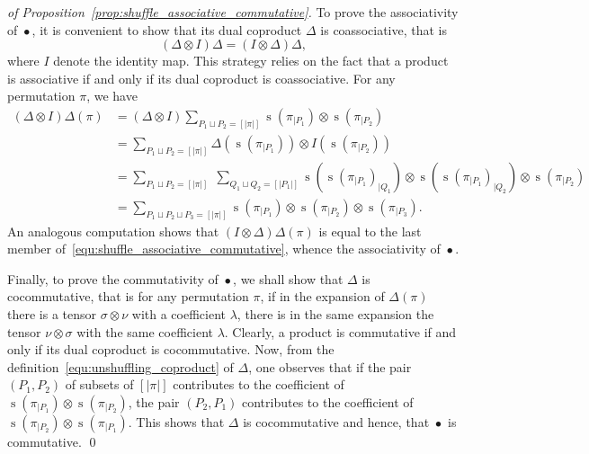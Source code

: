 \documentclass[a4paper]{llncs}
\DeclareMathOperator{\STD}{\mathrm{s}}
\DeclareMathOperator{\SHUFFLE}{\bullet}
\begin{document}
\begin{proof}[of Proposition~\ref{prop:shuffle_associative_commutative}]
    To prove the associativity of $\SHUFFLE$, it is convenient to show
    that its dual coproduct $\Delta$ is coassociative, that is
    \begin{equation}
        (\Delta \otimes I) \Delta = (I \otimes \Delta) \Delta,
    \end{equation}
    where $I$ denote the identity map. This strategy relies on the fact
    that a product is associative if and only if its dual coproduct is
    coassociative. For any permutation $\pi$, we have
    \begin{equation} \begin{split}
    \label{equ:shuffle_associative_commutative}
        (\Delta \otimes I) \Delta(\pi) & =
        (\Delta \otimes I)
        \sum_{P_1 \sqcup P_2 = [|\pi|]}
        \STD\left(\pi_{|P_1}\right) \otimes \STD\left(\pi_{|P_2}\right) \\
        & =
        \sum_{P_1 \sqcup P_2 = [|\pi|]}
        \Delta\left(\STD\left(\pi_{|P_1}\right)\right)
        \otimes I\left(\STD\left(\pi_{|P_2}\right)\right) \\
        & =
        \sum_{P_1 \sqcup P_2 = [|\pi|]} \;
        \sum_{Q_1 \sqcup Q_2 = [|P_1|]}
        \STD\left(\STD\left(\pi_{|P_1}\right)_{|Q_1}\right)
        \otimes
        \STD\left(\STD\left(\pi_{|P_1}\right)_{|Q_2}\right)
        \otimes \STD\left(\pi_{|P_2}\right) \\
        & =
        \sum_{P_1 \sqcup P_2 \sqcup P_3 = [|\pi|]}
        \STD\left(\pi_{|P_1}\right) \otimes
        \STD\left(\pi_{|P_2}\right) \otimes
        \STD\left(\pi_{|P_3}\right).
    \end{split} \end{equation}
    An analogous computation shows that $(I \otimes \Delta) \Delta(\pi)$
    is equal to the last member
    of~\eqref{equ:shuffle_associative_commutative}, whence the
    associativity of $\SHUFFLE$.
    \smallskip

    Finally, to prove the commutativity of $\SHUFFLE$, we shall show
    that $\Delta$ is cocommutative, that is for any permutation $\pi$,
    if in the expansion of $\Delta(\pi)$ there is a tensor
    $\sigma \otimes \nu$ with a coefficient $\lambda$, there is in the
    same expansion the tensor $\nu \otimes \sigma$ with the same
    coefficient $\lambda$. Clearly, a product is commutative if and only
    if its dual coproduct is cocommutative. Now, from the
    definition~\eqref{equ:unshuffling_coproduct} of $\Delta$, one
    observes that if the pair $(P_1, P_2)$ of subsets of $[|\pi|]$
    contributes to the coefficient of
    $\STD\left(\pi_{|P_1}\right) \otimes \STD\left(\pi_{|P_2}\right)$,
    the pair $(P_2, P_1)$ contributes to the coefficient of
    $\STD\left(\pi_{|P_2}\right) \otimes \STD\left(\pi_{|P_1}\right)$.
    This shows that $\Delta$ is cocommutative and hence, that $\SHUFFLE$
    is commutative.
    \qed
\end{proof}
\medskip
\end{document}
